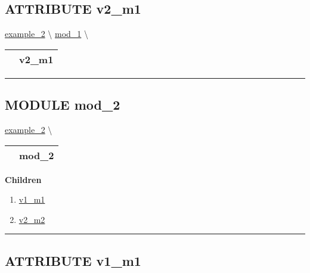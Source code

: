 \subsection*{\textsf{\colorbox{headtoc}{\color{white} ATTRIBUTE}
v2\_m1}}

\hypertarget{ecldoc:intest.example_2.mod_1.v2_m1}{}
\hspace{0pt} \hyperlink{ecldoc:intest.example_2}{example_2} \textbackslash 
\hspace{0pt} \hyperlink{ecldoc:intest.example_2.mod_1}{mod_1} \textbackslash 

{\renewcommand{\arraystretch}{1.5}
\begin{tabularx}{\textwidth}{|>{\raggedright\arraybackslash}l|X|}
\hline
\hspace{0pt}\mytexttt{\color{red} } & \textbf{v2\_m1} \\
\hline
\end{tabularx}
}

\par


\rule{\linewidth}{0.5pt}


\subsection*{\textsf{\colorbox{headtoc}{\color{white} MODULE}
mod\_2}}

\hypertarget{ecldoc:intest.example_2.mod_2}{}
\hspace{0pt} \hyperlink{ecldoc:intest.example_2}{example_2} \textbackslash 

{\renewcommand{\arraystretch}{1.5}
\begin{tabularx}{\textwidth}{|>{\raggedright\arraybackslash}l|X|}
\hline
\hspace{0pt}\mytexttt{\color{red} } & \textbf{mod\_2} \\
\hline
\end{tabularx}
}

\par


\textbf{Children}
\begin{enumerate}
\item \hyperlink{ecldoc:intest.example_2.mod_2.v1_m1}{v1\_m1}
\item \hyperlink{ecldoc:intest.example_2.mod_2.v2_m2}{v2\_m2}
\end{enumerate}

\rule{\linewidth}{0.5pt}

\subsection*{\textsf{\colorbox{headtoc}{\color{white} ATTRIBUTE}
v1\_m1}}

